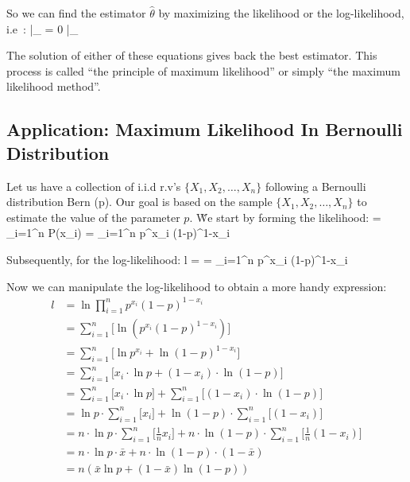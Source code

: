 So we can find the estimator $\hat{\theta}$ by maximizing the likelihood or the log-likelihood, i.e\ :
\bse
{} \Big|_{} = 0 \qquad {} \qquad
{} \Big|_{}
\ese

The solution of either of these equations gives back the best estimator. This process is called ``the principle of
maximum likelihood'' or simply ``the maximum likelihood method''.

\subsection{Application: Maximum Likelihood In Bernoulli Distribution}

Let us have a collection of i.i.d r.v's $\{ X_{1}, X_{2}, \ldots, X_{n} \}$ following a Bernoulli distribution Bern
(p). Our goal is based on the sample $\{ X_{1}, X_{2}, \ldots, X_{n} \}$ to estimate the value of the parameter $p$. \v

We start by forming the likelihood:
\bse
{} = \prod_{i=1}^{n} P(x_{i}) = \prod_{i=1}^{n} p^{x_{i}} (1-p)^{1-x_{i}}
\ese

Subsequently, for the log-likelihood:
\bse
l = \ln {} = \ln \prod_{i=1}^{n} p^{x_{i}} (1-p)^{1-x_{i}}
\ese

Now we can manipulate the log-likelihood to obtain a more handy expression:
\begingroup
\allowdisplaybreaks
{\setlength{\jot}{10pt}
\begin{align*}
l &= \ln \prod_{i=1}^{n} p^{x_{i}} (1-p)^{1-x_{i}} \\
&= \sum_{i=1}^{n} \Big[ \ln ( p^{x_{i}} (1-p)^{1-x_{i}}) \Big] \\
&= \sum_{i=1}^{n} \Big[ \ln p^{x_{i}} + \ln (1-p)^{1-x_{i}} \Big] \\
&= \sum_{i=1}^{n} \Big[ x_{i} \cdot \ln p + (1-x_{i}) \cdot \ln(1-p) \Big] \\
&= \sum_{i=1}^{n} \Big[ x_{i} \cdot \ln p \Big] + \sum_{i=1}^{n} \Big[ (1-x_{i}) \cdot \ln (1-p) \Big] \\
&= \ln p \cdot \sum_{i=1}^{n} \Big[ x_{i} \Big] + \ln (1-p) \cdot \sum_{i=1}^{n} \Big[ (1-x_{i}) \Big] \\
&= n \cdot \ln p \cdot \sum_{i=1}^{n} \Big[ \frac{1}{n} x_{i} \Big] +
n \cdot \ln (1-p) \cdot \sum_{i=1}^{n} \Big[ \frac{1}{n} (1-x_{i}) \Big] \\
&= n \cdot \ln p \cdot \bar{x} + n \cdot \ln (1-p) \cdot (1 - \bar{x}) \\
&= n (\bar{x} \ln p +(1 - \bar{x}) \ln (1-p))
\end{align*}}
\endgroup

